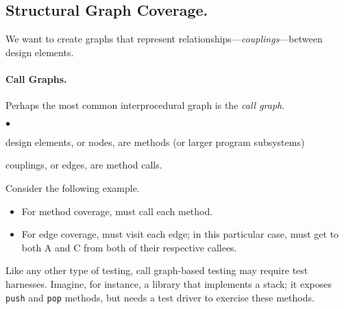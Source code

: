 \documentclass[11pt]{article}
\newcommand{\squishlist}{
 \begin{list}{$\bullet$}
  { \setlength{\itemsep}{0pt}
     \setlength{\parsep}{3pt}
     \setlength{\topsep}{3pt}
     \setlength{\partopsep}{0pt}
     \setlength{\leftmargin}{1.5em}
     \setlength{\labelwidth}{1em}
     \setlength{\labelsep}{0.5em} } }
\newcommand{\squishend}{
  \end{list}  }
\begin{document}
\vspace*{-1em}
\subsection*{Structural Graph Coverage.} We want to create graphs
that represent relationships---\emph{couplings}---between design elements.
\vspace*{-1em}

\paragraph{Call Graphs.} Perhaps the most common interprocedural
graph is the \emph{call graph}.
\squishlist
\item design elements, or nodes,
are methods (or larger program subsystems)
\item couplings, or edges, are method calls.
\squishend

Consider the following example.
\vspace*{-1em}
\begin{center}
\label{CFG}
\end{center}
\vspace*{-1em}

\begin{itemize}
\item For method coverage, must call each method. 
\item For edge coverage, must visit each edge; in this particular
  case, must get to both A and C from both of their respective
  callees.
\end{itemize}
\vspace*{-1em}
Like any other type of testing, call graph-based testing may require 
test harnesses. Imagine, for instance, a library that implements a
stack; it exposes {\tt push} and {\tt pop} methods, but needs a test
driver to exercise these methods.
\end{document}
